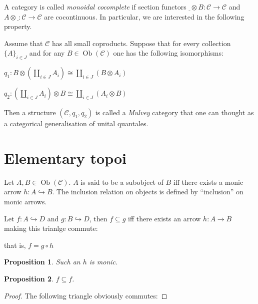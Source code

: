\documentclass[a4paper]{article}
\theoremstyle{defin}
\theoremstyle{theorem}
\theoremstyle{claim}
\theoremstyle{prop}
\newtheorem{prop}{Proposition}
\theoremstyle{lemma}
\theoremstyle{fact}
\theoremstyle{ex}
\theoremstyle{col}
\begin{document}
A category is called \emph{monoidal cocomplete} if section functors $\underline{ } \otimes B : \mathcal{C} \to \mathcal{C}$ and $A \otimes \underline{ }: \mathcal{C} \to \mathcal{C}$ are cocontinuous. In particular, we are interested in the following property.

Assume that $\mathcal{C}$ has all small coproducts. Suppose that for every collection $\{ A \}_{i \in J}$ and for any $B \in \operatorname{Ob}(\mathcal{C})$ one has the following isomorphisms:
\begin{center}
$q_1 : B \otimes (\coprod \limits_{i \in J} A_i) \cong \coprod \limits_{i \in J} (B \otimes A_i)$

$q_2 : (\coprod \limits_{i \in J} A_i) \otimes B \cong \coprod \limits_{i \in J} (A_i \otimes B)$
\end{center}

Then a structure $(\mathcal{C}, q_1, q_2)$ is called a \emph{Mulvey} category that one can thought as a categorical generalisation of unital quantales.

\section{Elementary topoi}

Let $A, B \in \operatorname{Ob}(\mathcal{C})$. $A$ is said to be a subobject of $B$ iff there exists a monic arrow $h : A \hookrightarrow B$. The inclusion relation on objects is defined by ``inclusion'' on monic arrows.

Let $f : A \hookrightarrow D$ and $g : B \hookrightarrow D$, then $f \subseteq g$ iff there exists an arrow $h : A \to B$ making this trianlge commute:

that is, $f = g \circ h$

\begin{prop}
Such an $h$ is monic.
\end{prop}

\begin{prop}
$f \subseteq f$.
\end{prop}

\begin{proof}
The following triangle obviously commutes:

\end{proof}
\end{document}
